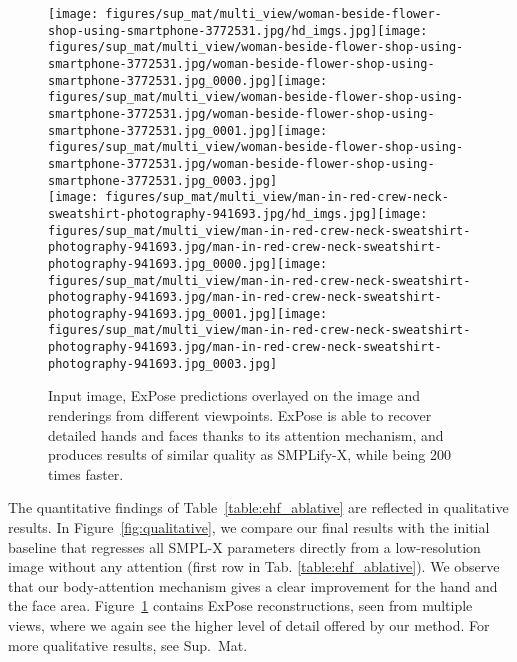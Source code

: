 \documentclass[runningheads]{llncs}
\newcommand{\modelname}{\mbox{ExPose}\xspace}
\newcommand{\smplx}{\mbox{SMPL-X}\xspace}
\newcommand{\smplifyx}{\mbox{SMPLify-X}\xspace}
\newcommand{\supmat}{Sup.~Mat.\xspace}
\begin{document}
\begin{figure}[!t]
    \centering
    \texttt{[image: figures/sup\_mat/multi\_view/woman-beside-flower-shop-using-smartphone-3772531.jpg/hd\_imgs.jpg]}\texttt{[image: figures/sup\_mat/multi\_view/woman-beside-flower-shop-using-smartphone-3772531.jpg/woman-beside-flower-shop-using-smartphone-3772531.jpg\_0000.jpg]}\texttt{[image: figures/sup\_mat/multi\_view/woman-beside-flower-shop-using-smartphone-3772531.jpg/woman-beside-flower-shop-using-smartphone-3772531.jpg\_0001.jpg]}\texttt{[image: figures/sup\_mat/multi\_view/woman-beside-flower-shop-using-smartphone-3772531.jpg/woman-beside-flower-shop-using-smartphone-3772531.jpg\_0003.jpg]}\\\texttt{[image: figures/sup\_mat/multi\_view/man-in-red-crew-neck-sweatshirt-photography-941693.jpg/hd\_imgs.jpg]}\texttt{[image: figures/sup\_mat/multi\_view/man-in-red-crew-neck-sweatshirt-photography-941693.jpg/man-in-red-crew-neck-sweatshirt-photography-941693.jpg\_0000.jpg]}\texttt{[image: figures/sup\_mat/multi\_view/man-in-red-crew-neck-sweatshirt-photography-941693.jpg/man-in-red-crew-neck-sweatshirt-photography-941693.jpg\_0001.jpg]}\texttt{[image: figures/sup\_mat/multi\_view/man-in-red-crew-neck-sweatshirt-photography-941693.jpg/man-in-red-crew-neck-sweatshirt-photography-941693.jpg\_0003.jpg]}
    \caption[]{
        Input image, \modelname predictions overlayed on the image and
        renderings from different viewpoints.
        \modelname is able to recover detailed hands and faces thanks to its attention mechanism, and
        produces results of similar quality as \smplifyx, while being
        200 times faster.
    }
    \label{fig:qualitative_mv}\end{figure}
 
The quantitative findings of Table~\ref{table:ehf_ablative} are
reflected in qualitative results.
In Figure~\ref{fig:qualitative}, we compare our final results with the initial baseline
that regresses all \smplx parameters directly from a low-resolution image without any
attention (first row in Tab. \ref{table:ehf_ablative}).
We observe that our body-attention mechanism gives a clear improvement for the hand and the face area.
Figure~\ref{fig:qualitative_mv} contains \modelname reconstructions, seen from multiple views, where we
again see the higher level of detail offered by our method.
For more qualitative results, see \supmat
\end{document}
